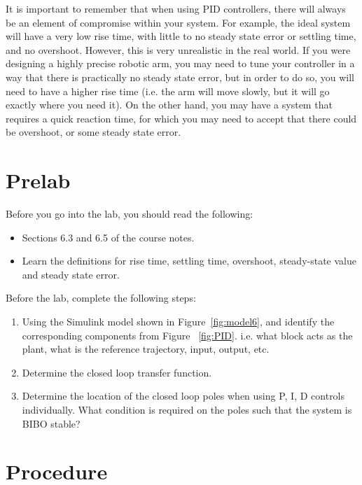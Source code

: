 It is important to remember that when using  PID controllers, there will always be an element of 
compromise within your system. For example, the ideal system will have a very low rise time, with 
little to no steady state error or settling time, and no overshoot. However, this is very unrealistic in 
the real world. If you were designing a highly precise robotic arm, you may need to tune your 
controller in a way that there is practically no steady state error, but in order to do so, you will need to 
have a higher rise time (i.e. the arm will move slowly, but it will go exactly where you need it). On 
the other hand, you may have a system that requires a quick reaction time, for which you may need 
to accept that there could be overshoot, or some steady state error. 
\section{Prelab}

Before you go into the lab, you should read the following:
\begin{itemize}
\item Sections 6.3 and 6.5 of the course notes.
\item Learn the definitions for rise time, settling time, overshoot, steady-state value and steady state error.
\end{itemize}
Before the lab, complete the following steps:
\begin{enumerate}
\item Using the Simulink model shown in Figure~\ref{fig:model6}, and identify
the corresponding components from Figure ~\ref{fig:PID}. i.e. what block acts as 
the plant, what is the reference trajectory, input, output, etc.
\item Determine the closed loop transfer function.
\item Determine the location of the closed loop poles when using P, I, D controls 
individually. What condition is required on the poles such that the system is BIBO stable?
\end{enumerate}

\section{Procedure}

